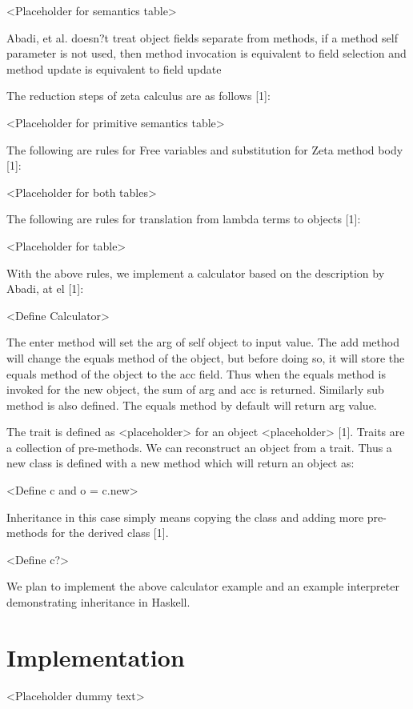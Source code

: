 \documentclass[10pt,twocolumn]{article}
\begin{document}
<Placeholder for semantics table>

Abadi, et al. doesn?t treat object fields separate from methods, if a method self parameter is not used, then method invocation is equivalent to field selection and method update is equivalent to field update

The reduction steps of zeta calculus are as follows [1]: 

<Placeholder for primitive semantics table>


The following are rules for Free variables and substitution for Zeta method body [1]: 

<Placeholder for both tables>


The following are rules for translation from lambda terms to objects [1]: 

<Placeholder for table>

With the above rules, we implement a calculator based on the description by Abadi, at el [1]: 

<Define Calculator>


The enter method will set the arg of self object to input value. The add method will change the equals method of the object, but before doing so, it will store the equals method of the object to the acc field. Thus when the equals method is invoked for the new object, the sum of arg and acc is returned. Similarly sub method is also defined. The equals method by default will return arg value. 

The trait is defined as  <placeholder> for an object <placeholder> [1]. Traits are a collection of pre-methods. We can reconstruct an object from a trait. Thus a new class is defined with a new method which will return an object as: 

<Define c and o = c.new>


Inheritance in this case simply means copying the class and adding more pre-methods for the derived class [1]. 

<Define c?>


We plan to implement the above calculator example and an example interpreter demonstrating inheritance in Haskell. 

\section{Implementation}

<Placeholder dummy text>

\end{document}
